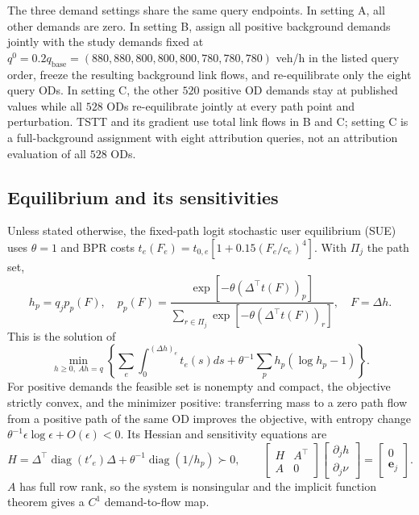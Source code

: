 The three demand settings share the same query endpoints. In setting A,
all other demands are zero. In setting B, assign all positive
background demands jointly with the study demands fixed at
$q^0=0.2q_{\mathrm{base}}=(880,880,800,800,800,780,780,780)$ veh/h in
the listed query order, freeze the resulting background link flows, and
re-equilibrate only the eight query ODs. In setting C, the other $520$
positive OD demands stay at published values while all $528$ ODs
re-equilibrate jointly at every path point and perturbation. TSTT and
its gradient use total link flows in B and C; setting C is a
full-background assignment with eight attribution queries, not an
attribution evaluation of all $528$ ODs.

\subsection{Equilibrium and its sensitivities}\label{supp:sue}
Unless stated otherwise, the fixed-path logit stochastic user equilibrium
(SUE) uses $\theta=1$ and BPR costs
$t_e(F_e)=t_{0,e}[1+0.15(F_e/c_e)^4]$. With $\Pi_j$ the path set,
\begin{equation}
h_p=q_jp_p(F),\quad
p_p(F)=\frac{\exp[-\theta(\Delta^\top t(F))_p]}
{\sum_{r\in\Pi_j}\exp[-\theta(\Delta^\top t(F))_r]},\quad
F=\Delta h.\label{eq:sueloading}
\end{equation}
This is the solution of
\[
\min_{h\ge0,\ Ah=q}\left\{
\sum_e\int_0^{(\Delta h)_e}t_e(s)ds+
\theta^{-1}\sum_p h_p(\log h_p-1)\right\}.
\]
For positive demands the feasible set is nonempty and compact, the
objective strictly convex, and the minimizer positive: transferring
mass to a zero path flow from a positive path of the same OD improves
the objective, with entropy change
$\theta^{-1}\epsilon\log\epsilon+O(\epsilon)<0$. Its Hessian and
sensitivity equations are
\begin{equation}
H=\Delta^\top\operatorname{diag}(t'_e)\Delta+
\theta^{-1}\operatorname{diag}(1/h_p)\succ0,\qquad
\begin{bmatrix}H&A^\top\\A&0\end{bmatrix}
\begin{bmatrix}\partial_jh\\\partial_j\nu\end{bmatrix}
=\begin{bmatrix}0\\\mathbf e_j\end{bmatrix}.
\label{eq:kkt_sensitivity}
\end{equation}
$A$ has full row rank, so the system is nonsingular and the implicit
function theorem gives a $C^1$ demand-to-flow map.

